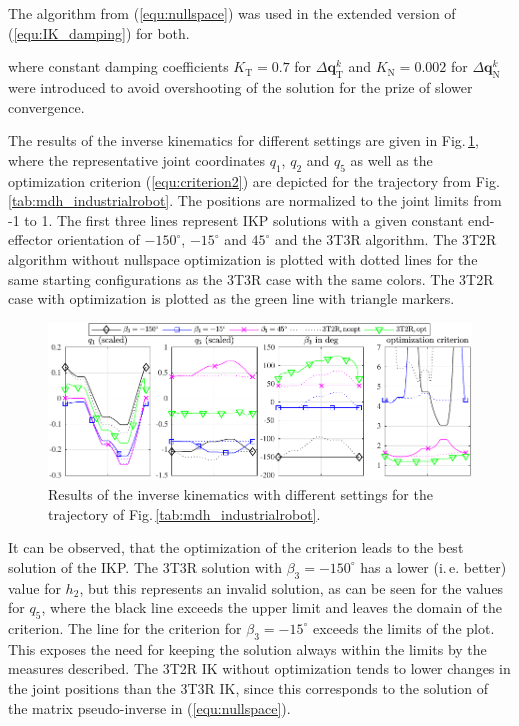 \documentclass[robotics,article,submit,moreauthors,pdftex]{Definitions/mdpi}
\newcommand{\bm}[1]{\boldsymbol{#1}}
\begin{document}
The algorithm from (\ref{equ:nullspace}) was used in the extended version of (\ref{equ:IK_damping}) for both.


%
where constant damping coefficients $K_\mathrm{T}=0.7$ for ${\Delta}\bm{q}_{\mathrm{T}}^k$ and $K_\mathrm{N}=0.002$ for ${\Delta}\bm{q}_{\mathrm{N}}^k$ were introduced to avoid overshooting of the solution for the prize of slower convergence.

The results of the inverse kinematics for different settings are given in Fig.\,\ref{fig:serrob_traj_3T2R}, where the representative joint coordinates $q_1$, $q_2$ and $q_5$ as well as the optimization criterion (\ref{equ:criterion2}) are depicted for the trajectory from Fig.\,\ref{tab:mdh_industrialrobot}.
The positions are normalized to the joint limits from -1 to 1.
The first three lines represent IKP solutions with a given constant end-effector orientation of $-150^\circ$, $-15^\circ$ and $45^\circ$ and the 3T3R algorithm.
The 3T2R algorithm without nullspace optimization is plotted with dotted lines for the same starting configurations as the 3T3R case with the same colors.
The 3T2R case with optimization is plotted as the green line with triangle markers.
%
\begin{figure}[tb]
	\includegraphics{serrob_traj_nullspace_optim.pdf}
	\caption{Results of the inverse kinematics with different settings for the trajectory of Fig.\,\ref{tab:mdh_industrialrobot}.}
	\label{fig:serrob_traj_3T2R}
\end{figure} 
%
It can be observed, that the optimization of the criterion leads to the best solution of the IKP.
The 3T3R solution with $\beta_3=-150^\circ$ has a lower (i.\,e. better) value for $h_2$, but this represents an invalid solution, as can be seen for the values for $q_5$, where the black line exceeds the upper limit and leaves the domain of the criterion.
The line for the criterion for $\beta_3=-15^\circ$ exceeds the limits of the plot.
This exposes the need for keeping the solution always within the limits by the measures described.
The 3T2R IK without optimization tends to lower changes in the joint positions than the 3T3R IK, since this corresponds to the solution of the matrix pseudo-inverse in (\ref{equ:nullspace}).
\end{document}
